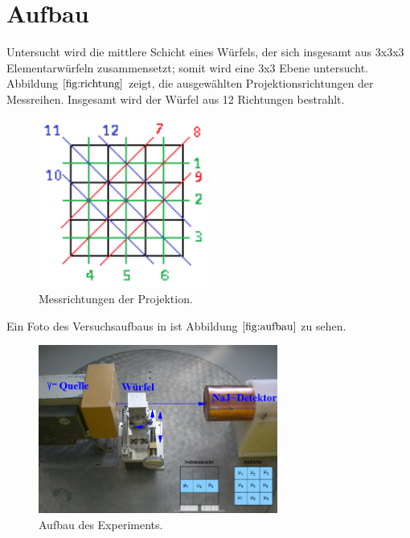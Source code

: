 \section{Aufbau}

Untersucht wird die mittlere Schicht eines Würfels, der sich insgesamt aus 3x3x3 Elementarwürfeln zusammensetzt; somit wird eine 3x3 Ebene untersucht.
Abbildung $\ref{fig:richtung}$ zeigt, die ausgewählten Projektionsrichtungen der Messreihen.
Insgesamt wird der Würfel aus 12 Richtungen bestrahlt.

\begin{figure}[H]
  \centering
  \includegraphics[width=0.5\textwidth]{Bilder/richtung.png}
  \caption{Messrichtungen der Projektion.}
  \label{fig:richtung}
\end{figure}
Ein Foto des Versuchsaufbaus in ist Abbildung $\ref{fig:aufbau}$ zu sehen.
\begin{figure}[H]
  \centering
  \includegraphics[width=0.7\textwidth]{Bilder/aufbau.png}
  \caption{Aufbau des Experiments.\cite{anleitung}}
  \label{fig:aufbau}
\end{figure}

